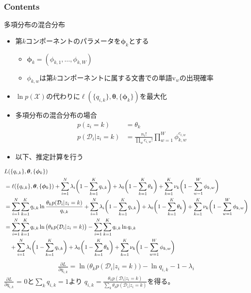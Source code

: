 \documentclass[aspectratio=169,unicode,dvipdfmx,14pt]{beamer}
\begin{document}
\begin{frame}\frametitle{Contents}
\Large \tableofcontents[currentsection]
\end{frame}


\begin{frame}{多項分布の混合分布}
\begin{itemize}
\item 第$k$コンポーネントのパラメータを$\bm{\phi}_k$とする
\begin{itemize}
\item $\bm{\phi}_k = (\phi_{k,1},\ldots,\phi_{k,W})$
\item $\phi_{k,w}$は第$k$コンポーネントに属する文書での単語$\mbox{v}_w$の出現確率
\end{itemize}
\item $\ln p(\mathcal{X})$の代わりに$\ell(\{q_{i,k}\},\bm{\theta}, \{ \bm{\phi}_k \})$を最大化
\item 多項分布の混合分布の場合
\begin{align}
p(z_i=k) & = \theta_k \\
p(\mathcal{D}_i | z_i=k) & = \frac{n_i!}{\prod_w c_{i,w}!} \prod_{w=1}^W \phi_{k,w}^{c_{i,w}}
\end{align}
\item 以下、推定計算を行う
\end{itemize}
\end{frame}

\begin{frame}
\FontMath
\begin{align}
& L(\{q_{i,k}\},\bm{\theta}, \{ \bm{\phi}_k \} ) 
\notag \\ &
= \ell(\{q_{i,k}\},\bm{\theta},\{ \bm{\phi}_k \})
+ \sum_{i=1}^N \lambda_i \bigg(1 - \sum_{k=1}^K q_{i,k}\bigg)
+ \lambda_0 \bigg( 1 - \sum_{k=1}^K \theta_k \bigg)
+ \sum_{k=1}^K \nu_k \bigg( 1 - \sum_{w=1}^W \phi_{k,w} \bigg)
\notag \\ &
= \sum_{i=1}^N \sum_{k=1}^K q_{i,k} \ln\frac{\theta_k p(\mathcal{D}_i | z_i = k)}{q_{i,k}}
+ \sum_{i=1}^N \lambda_i \bigg(1 - \sum_{k=1}^K q_{i,k}\bigg)
+ \lambda_0 \bigg( 1 - \sum_{k=1}^K \theta_k \bigg)
+ \sum_{k=1}^K \nu_k \bigg( 1 - \sum_{w=1}^W \phi_{k,w} \bigg)
\notag \\ &
= 
\sum_{i=1}^N \sum_{k=1}^K q_{i,k} \ln \big( \theta_k p(\mathcal{D}_i | z_i = k) \big)
- \sum_{i=1}^N \sum_{k=1}^K q_{i,k} \ln q_{i,k}
\notag \\ & \mbox{ \ \ }
+ \sum_{i=1}^N \lambda_i \bigg(1 - \sum_{k=1}^K q_{i,k}\bigg)
+ \lambda_0 \bigg( 1 - \sum_{k=1}^K \theta_k \bigg)
+ \sum_{k=1}^K \nu_k \bigg( 1 - \sum_{w=1}^W \phi_{k,w} \bigg)
\end{align}
\begin{align}
\frac{\partial L}{\partial q_{i,k}}
= \ln \big( \theta_k p(\mathcal{D}_i | z_i = k) \big) - \ln q_{i,k} - 1 - \lambda_i
\end{align}
$\frac{\partial L}{\partial q_{i,k}}$ = 0と$\sum_k q_{i,k}=1$より
$q_{i,k} = \frac{ \theta_k p(\mathcal{D}_i | z_i = k) }{ \sum_k \theta_k p(\mathcal{D}_i | z_i = k) }$を得る。
\end{frame}
\end{document}
